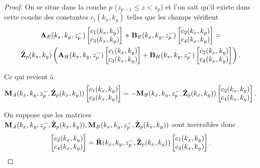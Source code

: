     \begin{proof}
      On se situe dans la couche \(p\) (\(z_{p-1}\le z < z_p\)) et l'on sait qu'il existe dans cette couche des constantes \(c_i(k_x,k_y)\) telles que les champs vérifient
      \begin{multline*}
        \mathbf{A}_{E}(k_x,k_y,z_p^-)
        \begin{bmatrix}
          c_1(k_x,k_y) \\
          c_3(k_x,k_y)
        \end{bmatrix}
        +
        \mathbf{B}_{E}(k_x,k_y,z_p^-)
        \begin{bmatrix}
          c_2(k_x,k_y) \\
          c_4(k_x,k_y)
        \end{bmatrix}
        =
        \\
        \hat {\mathbf{Z}}_{p}(k_x,k_y)
        \left(
          \mathbf{A}_{H}(k_x,k_y,z_p^-)
          \begin{bmatrix}
            c_1(k_x,k_y) \\
            c_3(k_x,k_y)
          \end{bmatrix}
          +
          \mathbf{B}_{H}(k_x,k_y,z_p^-)
          \begin{bmatrix}
            c_2(k_x,k_y) \\
            c_4(k_x,k_y)
          \end{bmatrix}
        \right).
      \end{multline*}

      Ce qui revient à 
      \begin{equation*}
        \mathbf{M}_{A}(k_x,k_y,z_p^-,\hat{\mathbf{Z}}_p(k_x,k_y))
        \begin{bmatrix}
          c_1(k_x,k_y) \\
          c_3(k_x,k_y)
        \end{bmatrix}
        =
        -\mathbf{M}_{B}(k_x,k_y,z_p^-,\hat{\mathbf{Z}}_p(k_x,k_y))
        \begin{bmatrix}
          c_2(k_x,k_y) \\
          c_4(k_x,k_y)
        \end{bmatrix}.
      \end{equation*}

      On suppose que les matrices \(\mathbf{M}_{A}(k_x,k_y,z_p^-,\hat{\mathbf{Z}}_p(k_x,k_y)), \mathbf{M}_{B}(k_x,k_y,z_p^-,\hat{\mathbf{Z}}_p(k_x,k_y))\) sont inversibles donc
      \begin{equation*}
        \begin{bmatrix}
          c_2(k_x,k_y) \\
          c_4(k_x,k_y)
        \end{bmatrix}
        =
        \hat{\mathbf{R}}(k_x,k_y,z_p^-,\hat{\mathbf{Z}}_p(k_x,k_y))
        \begin{bmatrix}
          c_1(k_x,k_y) \\
          c_3(k_x,k_y)
        \end{bmatrix}.
      \end{equation*}


\end{proof}

